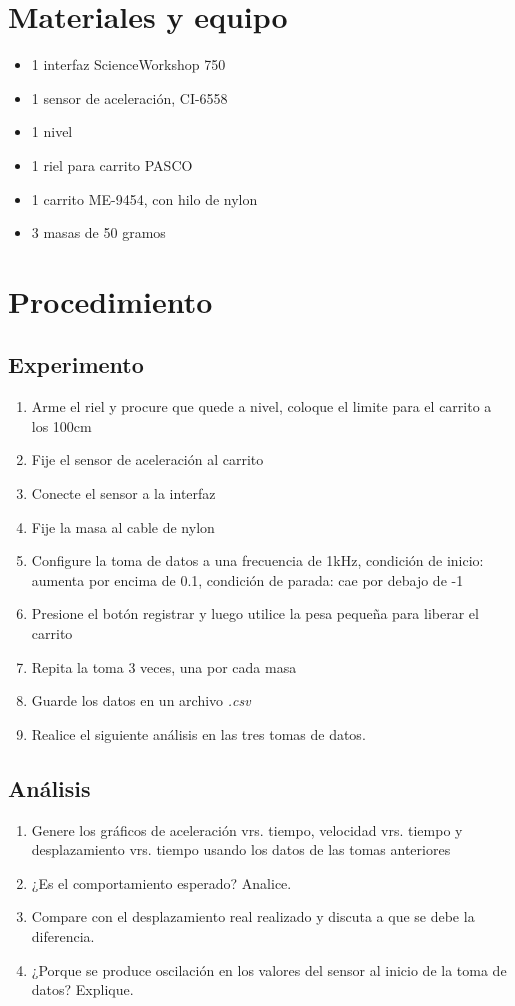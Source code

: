 \documentclass[12pt,letterpaper]{report}
\newcommand{\mat}{Materiales y equipo}
\newcommand{\pro}{Procedimiento}
\begin{document}
\section{\mat}
\begin{itemize}
\item 1 interfaz ScienceWorkshop\,\textregistered\,750
\item 1 sensor de aceleración, CI-6558
\item 1 nivel
\item 1 riel para carrito PASCO
\item 1 carrito ME-9454, con hilo de nylon
\item 3 masas de 50 gramos
\end{itemize}


\section{\pro}
\subsection{Experimento}
\begin{enumerate}
    
    \item Arme el riel y procure que quede a nivel, coloque el limite para el carrito a los 100cm
    \item Fije el sensor de aceleración al carrito
    \item Conecte el sensor a la interfaz
    \item Fije la masa al cable de nylon
    \item Configure la toma de datos a una frecuencia de 1kHz, condición de inicio: aumenta por encima de 0.1, condición de parada: cae por debajo de -1
    \item Presione el botón registrar y luego utilice la pesa pequeña para liberar el carrito
    \item Repita la toma 3 veces, una por cada masa
    \item Guarde los datos en un archivo \emph{.csv}
    \item Realice el siguiente análisis en las tres tomas de datos.
\end{enumerate}


\subsection{Análisis}
\begin{enumerate}
    \item Genere los gráficos de aceleración vrs. tiempo, velocidad vrs. tiempo y desplazamiento vrs. tiempo usando los datos de las tomas anteriores
    \item ¿Es el comportamiento esperado? Analice.
    \item Compare con el desplazamiento real realizado y discuta a que se debe la diferencia. 
    \item ¿Porque se produce oscilación en los valores del sensor al inicio de la toma de datos? Explique. 
\end{enumerate}
\end{document}
